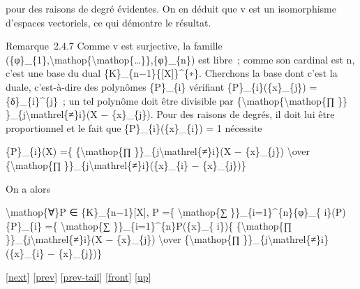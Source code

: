 \documentclass[]{article}
\begin{document}
pour des raisons de degré évidentes. On en déduit que v est un
isomorphisme d'espaces vectoriels, ce qui démontre le résultat.

Remarque~2.4.7 Comme v est surjective, la famille
(\{φ\}\_\{1\},\textbackslash{}mathop\{\textbackslash{}mathop\{\ldots{}\}\},\{φ\}\_\{n\})
est libre~; comme son cardinal est n, c'est une base du dual
\{K\}\_\{n−1\}\{{[}X{]}\}\^{}\{∗\}. Cherchons la base dont c'est la
duale, c'est-à-dire des polynômes \{P\}\_\{i\} vérifiant
\{P\}\_\{i\}(\{x\}\_\{j\}) = \{δ\}\_\{i\}\^{}\{j\}~; un tel polynôme
doit être divisible par
\{\textbackslash{}mathop\{\textbackslash{}mathop\{∏ \}\}
\}\_\{j\textbackslash{}mathrel\{≠\}i\}(X − \{x\}\_\{j\}). Pour des
raisons de degrés, il doit lui être proportionnel et le fait que
\{P\}\_\{i\}(\{x\}\_\{i\}) = 1 nécessite

\{P\}\_\{i\}(X) =\{ \{\textbackslash{}mathop\{∏
\}\}\_\{j\textbackslash{}mathrel\{≠\}i\}(X − \{x\}\_\{j\})
\textbackslash{}over \{\textbackslash{}mathop\{∏
\}\}\_\{j\textbackslash{}mathrel\{≠\}i\}(\{x\}\_\{i\} − \{x\}\_\{j\})\}

On a alors

\textbackslash{}mathop\{∀\}P ∈ \{K\}\_\{n−1\}{[}X{]}, P =\{
\textbackslash{}mathop\{∑ \}\}\_\{i=1\}\^{}\{n\}\{φ\}\_\{
i\}(P)\{P\}\_\{i\} =\{ \textbackslash{}mathop\{∑
\}\}\_\{i=1\}\^{}\{n\}P(\{x\}\_\{ i\})\{ \{\textbackslash{}mathop\{∏
\}\}\_\{j\textbackslash{}mathrel\{≠\}i\}(X − \{x\}\_\{j\})
\textbackslash{}over \{\textbackslash{}mathop\{∏
\}\}\_\{j\textbackslash{}mathrel\{≠\}i\}(\{x\}\_\{i\} − \{x\}\_\{j\})\}

{[}\href{coursse11.html}{next}{]} {[}\href{coursse9.html}{prev}{]}
{[}\href{coursse9.html\#tailcoursse9.html}{prev-tail}{]}
{[}\href{coursse10.html}{front}{]}
{[}\href{coursch3.html\#coursse10.html}{up}{]}
\end{document}
